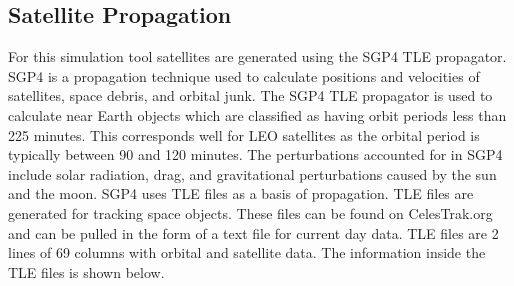 \documentclass[12pt]{report}
\begin{document}
\subsection{Satellite Propagation}
For this simulation tool satellites are generated using the SGP4 TLE propagator. SGP4 is a propagation technique used to calculate positions and velocities of satellites, space debris, and orbital junk. The SGP4 TLE propagator is used to calculate near Earth objects which are classified as having orbit periods less than 225 minutes. This corresponds well for LEO satellites as the orbital period is typically between 90 and 120 minutes. The perturbations accounted for in SGP4 include solar radiation, drag, and gravitational perturbations caused by the sun and the moon. SGP4 uses TLE files as a basis of propagation. TLE files are generated for tracking space objects. These files can be found on CelesTrak.org and can be pulled in the form of a text file for current day data. TLE files are 2 lines of 69 columns with orbital and satellite data. The information inside the TLE files is shown below.
\end{document}
